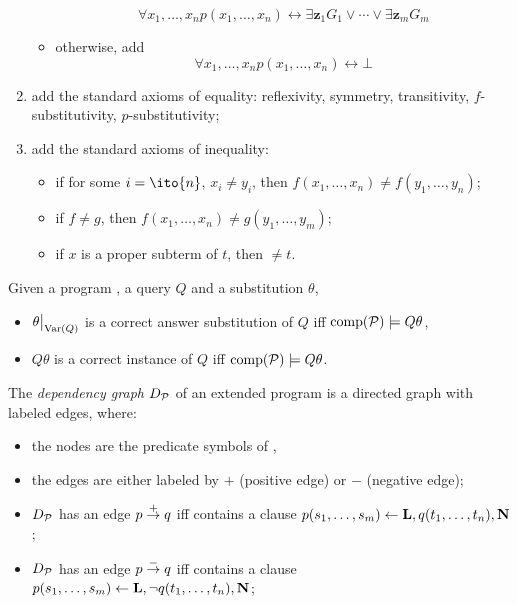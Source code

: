 \begin{dfn}[Completion]
\begin{enumerate}
\begin{itemize}
\begin{equation*}
                \forall{x_1,\dotsc,x_n} p(x_1,\dotsc,x_n) \leftrightarrow \exists{\mathbf{z}_1} G_1 \lor \dotsb \lor \exists{\mathbf{z}_m} G_m
            \end{equation*}
            \item otherwise, add
            \begin{equation*}
                \forall{x_1,\dotsc,x_n} p(x_1,\dotsc,x_n) \leftrightarrow \bot
            \end{equation*}
        \end{itemize}
        \item add the standard axioms of equality: reflexivity, symmetry, transitivity, \(f\)-substitutivity, \(p\)-substitutivity;
        \item add the standard axioms of inequality:
        \begin{itemize}
            \item if for some \(i = \ito{n}\), \(x_i \ne y_i\), then \(f(x_1,\dotsc,x_n) \ne f(y_1,\dotsc,y_n)\);
            \item if \(f \ne g\), then \(f(x_1,\dotsc,x_n) \ne g(y_1,\dotsc,y_m)\);
            \item if \(x\) is a proper subterm of \(t\), then \( \ne t\).
        \end{itemize}
    \end{enumerate}
\end{dfn}

\begin{dfn}
    Given a program \prog, a query \(Q\) and a substitution \(\theta\),
    \begin{itemize}
        \item \(\restr{\theta}{\Var(Q)}\) is a correct answer substitution of \(Q\) iff \(\operatorname{comp}(\mathcal{P}) \models Q\theta\),
        \item \(Q\theta\) is a correct instance of \(Q\) iff \(\operatorname{comp}(\mathcal{P}) \models Q\theta\).
    \end{itemize}
\end{dfn}

\begin{dfn}
    The \emph{dependency graph} \(D_\mathcal{P}\) of an extended program \prog is a directed graph with labeled edges, where:
    \begin{itemize}
        \item the nodes are the predicate symbols of \prog,
        \item the edges are either labeled by \(+\) (positive edge) or \(-\) (negative edge);
        \item \(D_\mathcal{P}\) has an edge \(p \overset{+}{\to} q\) iff \prog contains a clause \(p(s_1,\dotsc,s_m) \leftarrow \mathbf{L}, q(t_1,\dotsc,t_n),\mathbf{N}\);
        \item \(D_\mathcal{P}\) has an edge \(p \overset{-}{\to} q\) iff \prog contains a clause \(p(s_1,\dotsc,s_m) \leftarrow \mathbf{L}, \neg q(t_1,\dotsc,t_n),\mathbf{N}\);
    \end{itemize}
\end{dfn}

